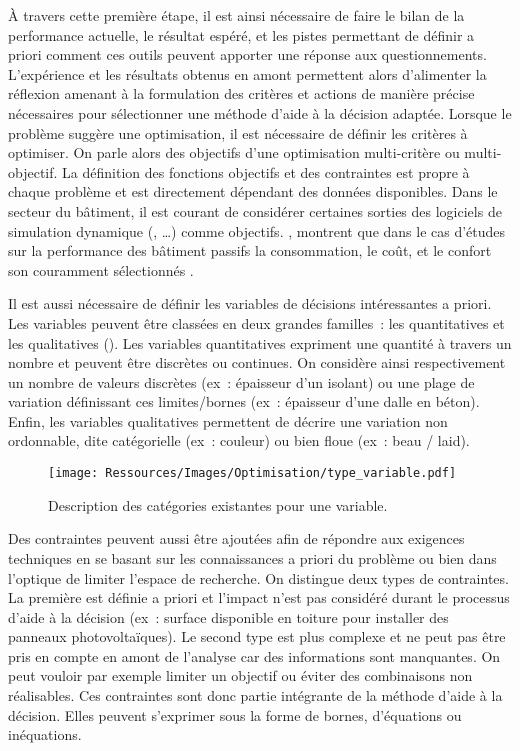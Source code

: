 À travers cette première étape, il est ainsi nécessaire de faire le bilan de la
performance actuelle, le résultat espéré, et les pistes permettant de définir a priori
comment ces outils peuvent apporter une réponse aux questionnements. L’expérience et les
résultats obtenus en amont permettent alors d’alimenter la réflexion amenant à la
formulation des critères et actions de manière précise nécessaires pour sélectionner une
méthode d’aide à la décision adaptée. Lorsque le problème suggère une optimisation, il est
nécessaire de définir les critères à optimiser. On parle alors des objectifs d’une
optimisation multi-critère ou multi-objectif. La définition des fonctions objectifs et des
contraintes est propre à chaque problème et est directement dépendant des données
disponibles. Dans le secteur du bâtiment, il est courant de considérer certaines sorties
des logiciels de simulation dynamique (, \dots) comme objectifs.
\textcite{Attia2013110}, montrent que dans le cas d’études sur la performance des bâtiment
passifs la consommation, le coût, et le confort son couramment sélectionnés .

Il est aussi nécessaire de définir les variables de décisions intéressantes a priori.
Les variables peuvent être classées en deux grandes familles~: les quantitatives et
les qualitatives ().
Les variables quantitatives expriment une quantité à travers un nombre et
peuvent être discrètes ou continues. On considère ainsi respectivement un nombre de
valeurs discrètes (ex~: épaisseur d’un isolant) ou une plage de variation définissant
ces limites/bornes (ex~: épaisseur d’une dalle en béton).
Enfin, les variables qualitatives permettent de décrire une variation non ordonnable,
dite catégorielle (ex~: couleur) ou bien floue (ex~: beau / laid).

\begin{figure}
    \centering
    \texttt{[image: Ressources/Images/Optimisation/type\_variable.pdf]}
    \caption{Description des catégories existantes pour une variable.}
    \label{fig:type_variable}
\end{figure}

Des contraintes peuvent aussi être ajoutées afin de répondre aux exigences
techniques en se basant sur les connaissances a priori du problème ou bien dans
l’optique de limiter l’espace de recherche. On distingue deux types de contraintes.
La première est définie a priori et l’impact n’est pas considéré durant le processus
d’aide à la décision (ex~: surface disponible en toiture pour installer des
panneaux photovoltaïques).
Le second type est plus complexe et ne peut pas être pris en compte en amont de
l’analyse car des informations sont manquantes. On peut vouloir par exemple limiter
un objectif ou éviter des combinaisons non réalisables. Ces contraintes sont donc
partie intégrante de la méthode d’aide à la décision.
Elles peuvent s’exprimer sous la forme de bornes, d’équations ou inéquations.


